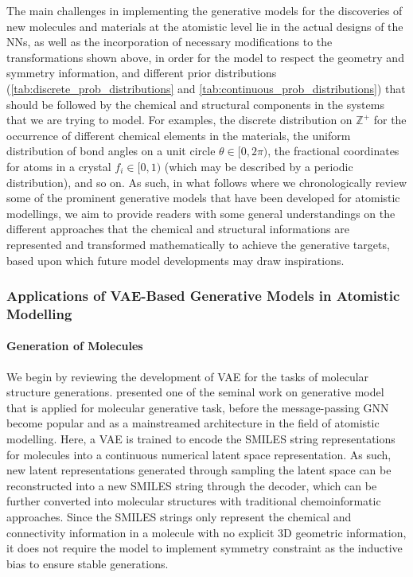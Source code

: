 The main challenges in implementing the generative models for the discoveries of new molecules and materials at the atomistic level lie in the actual designs of the NNs, as well as the incorporation of necessary modifications to the transformations shown above, in order for the model to respect the geometry and symmetry information, and different prior distributions (\cref{tab:discrete_prob_distributions} and \cref{tab:continuous_prob_distributions}) that should be followed by the chemical and  structural components in the systems that we are trying to model. For examples, the discrete distribution on $\mathbb{Z}^{+}$ for the occurrence of different chemical elements in the materials, the uniform distribution of bond angles on a unit circle $\theta\in[0,2\pi)$, the fractional coordinates for atoms in a crystal $f_i\in[0,1)$ (which may be described by a periodic distribution), and so on. As such, in what follows where we chronologically review some of the prominent generative models that have been developed for atomistic modellings, we aim to provide readers with some general understandings on the different approaches that the chemical and structural informations are represented and transformed mathematically to achieve the generative targets, based upon which future model developments may draw inspirations.


\subsubsection{Applications of VAE-Based Generative Models in Atomistic Modelling}
\label{sec:generative_VAE_examples}

\paragraph{\textbf{Generation of Molecules}}

We begin by reviewing the development of VAE for the tasks of molecular structure generations. \citet{gomez2018automatic}  presented one of the seminal work on generative model that is applied for molecular generative task, before the message-passing GNN\cite{gilmer2017neural} become popular and as a mainstreamed architecture in the field of atomistic modelling. Here, a VAE is trained to encode the SMILES string representations for molecules into a continuous numerical latent space representation. As such, new latent representations generated through sampling the latent space can be reconstructed into a new SMILES string through the decoder, which can be further converted into molecular structures with traditional chemoinformatic approaches. Since the SMILES strings only represent the chemical and connectivity information in a molecule with no explicit 3D geometric information, it does not require the model to implement symmetry constraint as the inductive bias to ensure stable generations.


